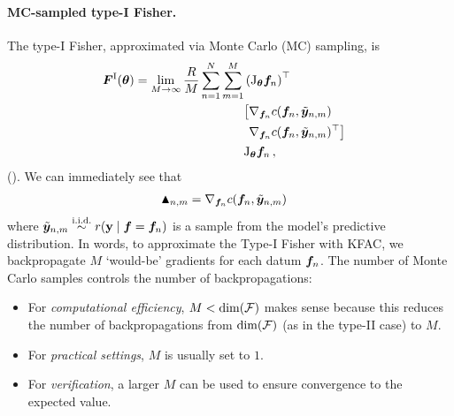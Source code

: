 \paragraph{MC-sampled type-I Fisher.}
The type-I Fisher, approximated via Monte Carlo (MC) sampling, is
\begin{align*}
  &\begin{aligned}
    {\bm{F}}^{\text{I}}({\bm{\theta}}) = \lim_{M \to \infty} \frac{R}{M} \sum_{n=1}^N\sum_{m=1}^M
    &\left( \mathrm{J}_{{\bm{\theta}}} {\bm{f}}_n\right)^{\top} \\
    &
      \begin{aligned}
        \big[
        &\nabla_{{\bm{f}}_n} c({\bm{f}}_n, \tilde{{\bm{y}}}_{n,m}) \\
        &\nabla_{{\bm{f}}_n} c({\bm{f}}_n, \tilde{{\bm{y}}}_{n,m})^{\top}
          \big]
      \end{aligned} \\
    &\mathrm{J}_{{\bm{\theta}}} {\bm{f}}_n\,,
  \end{aligned}
\end{align*}
().
We can immediately see that
\begin{align*}
  \blacktriangle_{n,m}
  &= \nabla_{{\bm{f}}_n}  c({\bm{f}}_n, \tilde{{\bm{y}}}_{n,m})
\end{align*}
where $\tilde{\vy}_{n,m} \stackrel{\text{\iid}}{\sim} r(\rvy \mid \vf = \vf_n)$ is a sample from the model's predictive distribution.
In words, to approximate the Type-I Fisher with KFAC, we backpropagate $M$ `would-be' gradients for each datum ${\bm{f}}_n$.
The number of Monte Carlo samples controls the number of backpropagations:
\begin{itemize}
\item For \emph{computational efficiency}, $M<\dim({\mathcal{F}})$ makes sense because this reduces the number of backpropagations from $\dim({\mathcal{F}})$ (as in the type-II case) to $M$.
\item For \emph{practical settings}, $M$ is usually set to $1$.
\item For \emph{verification}, a larger $M$ can be used to ensure convergence to the expected value.
\end{itemize}


